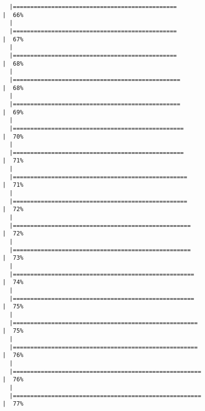 \documentclass[
  letterpaper,
]{book}
\begin{document}
\begin{verbatim}
  |===============================================                       |  66%
  |                                                                            
  |===============================================                       |  67%
  |                                                                            
  |===============================================                       |  68%
  |                                                                            
  |================================================                      |  68%
  |                                                                            
  |================================================                      |  69%
  |                                                                            
  |=================================================                     |  70%
  |                                                                            
  |=================================================                     |  71%
  |                                                                            
  |==================================================                    |  71%
  |                                                                            
  |==================================================                    |  72%
  |                                                                            
  |===================================================                   |  72%
  |                                                                            
  |===================================================                   |  73%
  |                                                                            
  |====================================================                  |  74%
  |                                                                            
  |====================================================                  |  75%
  |                                                                            
  |=====================================================                 |  75%
  |                                                                            
  |=====================================================                 |  76%
  |                                                                            
  |======================================================                |  76%
  |                                                                            
  |======================================================                |  77%

\end{verbatim}
\end{document}
